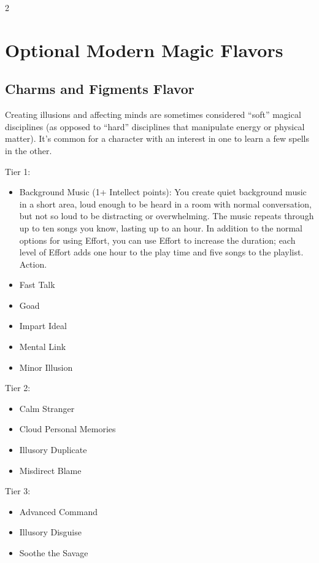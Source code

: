 \begin{multicols}{2}
\chapter{Optional Modern Magic Flavors}

\section{Charms and Figments Flavor}

Creating illusions and affecting minds are sometimes considered “soft” magical disciplines (as opposed to “hard” disciplines that manipulate energy or physical matter). It’s common for a character with an interest in one to learn a few spells in the other.

Tier 1:

\begin{itemize}
\item Background Music (1+ Intellect points): You create quiet background music in a short area, loud enough to be heard in a room with normal conversation, but not so loud to be distracting or overwhelming. The music repeats through up to ten songs you know, lasting up to an hour. In addition to the normal options for using Effort, you can use Effort to increase the duration; each level of Effort adds one hour to the play time and five songs to the playlist. Action. 
\item Fast Talk 
\item Goad 
\item Impart Ideal
\item Mental Link
\item Minor Illusion
\end{itemize}

Tier 2:

\begin{itemize}
\item Calm Stranger
\item Cloud Personal Memories 
\item Illusory Duplicate 
\item Misdirect Blame 
\end{itemize}

Tier 3:

\begin{itemize}
\item Advanced Command 
\item Illusory Disguise 
\item Soothe the Savage 
\end{itemize}


\end{multicols}
